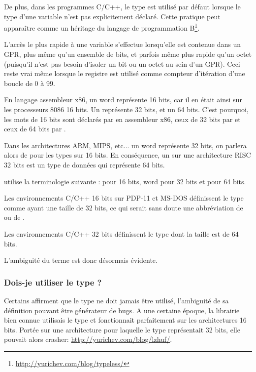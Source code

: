 De plus, dans les programmes C/C++, le type  est utilisé par défaut lorsque le type d'une variable n'est pas explicitement déclaré.
Cette pratique peut apparaître comme un héritage du langage de programmation B\footnote{\url{http://yurichev.com/blog/typeless/}}.

\myhrule{}

L'accès le plus rapide à une variable s'effectue lorsqu'elle est contenue dans un \ac{GPR}, plus même qu'un ensemble de bits,
et parfois même plus rapide qu'un octet (puisqu'il n'est pas besoin d'isoler un bit ou un octet au sein d'un \ac{GPR}).
Ceci reste vrai même lorsque le registre est utilisé comme compteur d'itération d'une boucle de 0 à 99.

\myhrule{}

En langage assembleur x86, un \gls{word} représente 16 bits, car il en était ainsi sur les processeurs 8086 16 bits.
Un  représente 32 bits, et un  64 bits.
C'est pourquoi, les mots de 16 bits sont déclarés par  en assembleur x86, ceux de 32 bits par  et ceux de 64 bits par .

Dans les architectures ARM, MIPS, etc... un \gls{word} représente 32 bits, on parlera alors de  pour les types sur 16 bits.
En conséquence, un  sur une architecture RISC 32 bits est un type de données qui représente 64 bits.

 utilise la terminologie suivante :  pour 16 bits, \gls{word} pour 32 bits et  pour 64 bits.

Les environnements C/C++ 16 bits sur PDP-11 et MS-DOS définissent le type  comme ayant une taille de 32 bits, 
ce qui serait sans doute une abbréviation de  ou de .

Les environnements C/C++ 32 bits définissent le type  dont la taille est de 64 bits.

L'ambiguité du terme  est donc désormais évidente.

\subsubsection{Dois-je utiliser le type ?}

Certains affirment que le type  ne doit jamais être utilisé, l'ambiguité de sa définition pouvant être générateur de bugs.
A une certaine époque, la librairie bien connue  utilisais le type  et fonctionnait parfaitement sur les architectures 16 bits.
Portée sur une architecture pour laquelle le type  représentait 32 bits, elle pouvait alors crasher: \url{http://yurichev.com/blog/lzhuf/}.

